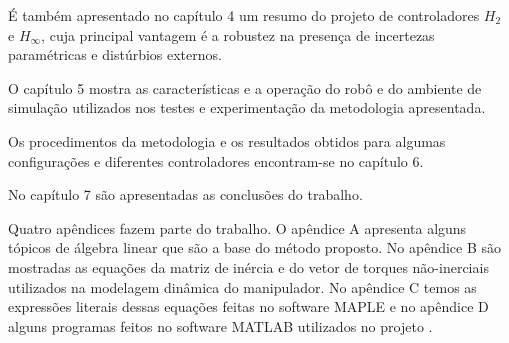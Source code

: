 É também apresentado no capítulo 4 um resumo do projeto de controladores  $H_{2}$ e $H_{\infty}$, cuja principal vantagem é a robustez na presença de incertezas paramétricas e distúrbios externos.

O capítulo 5 mostra as características e a operação do robô e do ambiente de simulação utilizados nos testes e experimentação da metodologia apresentada.

Os procedimentos da metodologia e os resultados obtidos para algumas configurações e diferentes controladores encontram-se no capítulo 6.

No capítulo 7 são apresentadas as conclusões do trabalho.

Quatro apêndices fazem parte do trabalho. O apêndice A apresenta alguns tópicos de álgebra linear que são a base do método proposto. No apêndice B são mostradas as equações da matriz de inércia e do vetor de torques não-inerciais
utilizados na modelagem dinâmica do manipulador. No apêndice C temos as expressões literais dessas equações feitas no software MAPLE e no apêndice D alguns programas feitos no software MATLAB utilizados no projeto \cite{Furmento1995}\cite{Morgado2003}.

